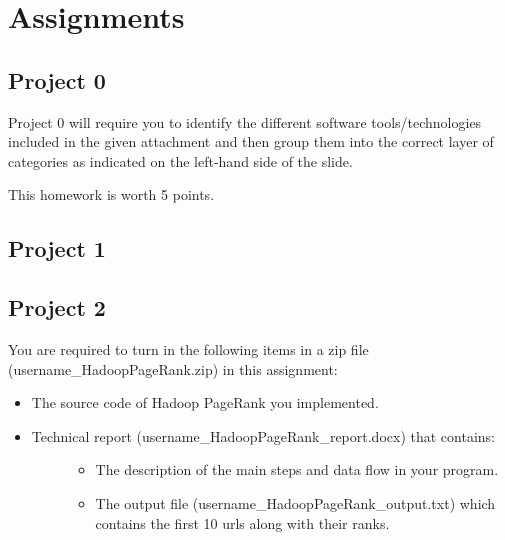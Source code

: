 \part{Assignments}\label{assignments}

\chapter{Project 0}\label{assignment-0}

Project 0 will require you to identify the different software
tools/technologies included in the given attachment and then group them
into the correct layer of categories as indicated on the left-hand side
of the slide.

This homework is worth 5 points.


\chapter{Project 1}\label{project-1}

%



\chapter{Project 2}\label{project-2}



You are required to turn in the following items in a zip file
(username\_HadoopPageRank.zip) in this assignment:

\begin{itemize}
\item
  The source code of Hadoop PageRank you implemented.
\item
  \begin{description}
  \item[Technical report (username\_HadoopPageRank\_report.docx) that
  contains:]
  \begin{itemize}
  \tightlist
  \item
    The description of the main steps and data flow in your program.
  \item
    The output file (username\_HadoopPageRank\_output.txt) which
    contains the first 10 urls along with their ranks.
  \end{itemize}
  \end{description}
\end{itemize}

